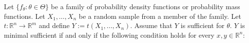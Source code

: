 \begin{theorem}\label{mathstats.thm.5.8} Let \(\{f_\theta: \theta \in \Theta\}\) be a family of probability density functions or probability mass functions. Let \(X_1, \ldots, X_n\) be a random sample from a member of the family. Let \(t: \mathbb{R}^n \to \mathbb{R}^m\) and define \(Y:= t(X_1, \ldots, X_n)\). Assume that \(Y\) is sufficient for \(\theta\). \(Y\) is minimal sufficient if and only if the following condition holds for every \(x, y \in \mathbb{R}^n\):


\begin{center}
\noindent{}
\end{center}

\end{theorem}


